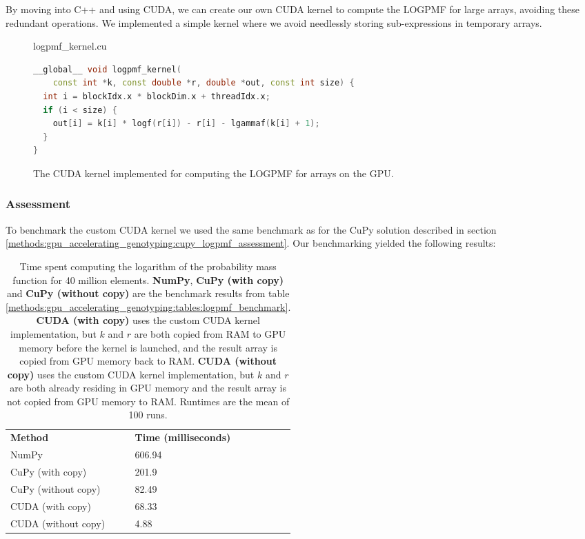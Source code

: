 By moving into C++ and using CUDA, we can create our own CUDA kernel to compute the LOGPMF for large arrays, avoiding these redundant operations.
We implemented a simple kernel where we avoid needlessly storing sub-expressions in temporary arrays.
\begin{figure}[H] 
\begin{center}
logpmf\_kernel.cu
\end{center}
\begin{lstlisting}[language=C++,style=cppcode]
__global__ void logpmf_kernel(
    const int *k, const double *r, double *out, const int size) {
  int i = blockIdx.x * blockDim.x + threadIdx.x;
  if (i < size) {
    out[i] = k[i] * logf(r[i]) - r[i] - lgammaf(k[i] + 1);
  }
}
\end{lstlisting}
\caption{
  The CUDA kernel implemented for computing the LOGPMF for arrays on the GPU.
}
\label{methods:gpu_accelerating_genotyping:figures:logpmf_kernel}
\end{figure}

\subsubsection{Assessment}
To benchmark the custom CUDA kernel we used the same benchmark as for the CuPy solution described in section \ref{methods:gpu_accelerating_genotyping:cupy_logpmf_assessment}.
Our benchmarking yielded the following results:
\begin{table}[H]
\begin{center}
\begin{tabular}{lllll}
\multicolumn{1}{l|}{\textbf{Method}} & \multicolumn{1}{l}{\textbf{Time (milliseconds)}} &  \\ \cline{1-2}
\multicolumn{1}{l|}{NumPy} & \multicolumn{1}{l}{606.94} &  \\
\multicolumn{1}{l|}{CuPy (with copy)} & \multicolumn{1}{l}{201.9} & \\
\multicolumn{1}{l|}{CuPy (without copy)} & \multicolumn{1}{l}{82.49} & \\
\multicolumn{1}{l|}{CUDA (with copy)} & \multicolumn{1}{l}{68.33} & \\
\multicolumn{1}{l|}{CUDA (without copy)} & \multicolumn{1}{l}{4.88}
\end{tabular}
\end{center}
\caption{
  Time spent computing the logarithm of the probability mass function for 40 million elements.
  \textbf{NumPy}, \textbf{CuPy (with copy)} and \textbf{CuPy (without copy)} are the benchmark results from table \ref{methods:gpu_accelerating_genotyping:tables:logpmf_benchmark}.
  \textbf{CUDA (with copy)} uses the custom CUDA kernel implementation, but $k$ and $r$ are both copied from RAM to GPU memory before the kernel is launched, and the result array is copied from GPU memory back to RAM.
  \textbf{CUDA (without copy)} uses the custom CUDA kernel implementation, but $k$ and $r$ are both already residing in GPU memory and the result array is not copied from GPU memory to RAM.
  Runtimes are the mean of 100 runs.
}
\label{methods:gpu_accelerating_genotyping:tables:logpmf_benchmark_2}
\end{table}

